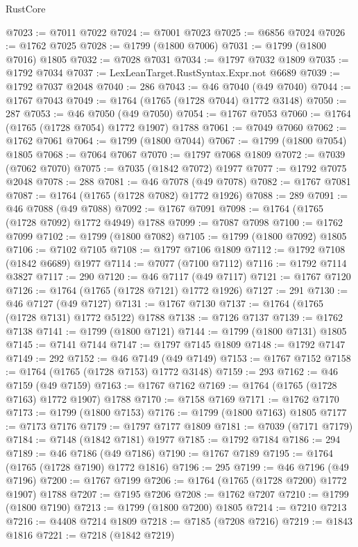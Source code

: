 \begin{lexlean}{RustCore}
\begin{coremodule}
@7023 := @7011 @7022
@7024 := @7001 @7023
@7025 := @6856 @7024
@7026 := @1762 @7025
@7028 := @1799 (@1800 @7006)
@7031 := @1799 (@1800 @7016) @1805
@7032 := @7028 @7031
@7034 := @1797 @7032 @1809
@7035 := @1792 @7034
@7037 := LexLeanTarget.RustSyntax.Expr.not @6689
@7039 := @1792 @7037 @2048
@7040 := 286
@7043 := @46 @7040 (@49 @7040)
@7044 := @1767 @7043
@7049 := @1764 (@1765 (@1728 @7044) @1772 @3148)
@7050 := 287
@7053 := @46 @7050 (@49 @7050)
@7054 := @1767 @7053
@7060 := @1764 (@1765 (@1728 @7054) @1772 @1907) @1788
@7061 := @7049 @7060
@7062 := @1762 @7061
@7064 := @1799 (@1800 @7044)
@7067 := @1799 (@1800 @7054) @1805
@7068 := @7064 @7067
@7070 := @1797 @7068 @1809
@7072 := @7039 (@7062 @7070)
@7075 := @7035 (@1842 @7072) @1977
@7077 := @1792 @7075 @2048
@7078 := 288
@7081 := @46 @7078 (@49 @7078)
@7082 := @1767 @7081
@7087 := @1764 (@1765 (@1728 @7082) @1772 @1926)
@7088 := 289
@7091 := @46 @7088 (@49 @7088)
@7092 := @1767 @7091
@7098 := @1764 (@1765 (@1728 @7092) @1772 @4949) @1788
@7099 := @7087 @7098
@7100 := @1762 @7099
@7102 := @1799 (@1800 @7082)
@7105 := @1799 (@1800 @7092) @1805
@7106 := @7102 @7105
@7108 := @1797 @7106 @1809
@7112 := @1792 @7108 (@1842 @6689) @1977
@7114 := @7077 (@7100 @7112)
@7116 := @1792 @7114 @3827
@7117 := 290
@7120 := @46 @7117 (@49 @7117)
@7121 := @1767 @7120
@7126 := @1764 (@1765 (@1728 @7121) @1772 @1926)
@7127 := 291
@7130 := @46 @7127 (@49 @7127)
@7131 := @1767 @7130
@7137 := @1764 (@1765 (@1728 @7131) @1772 @5122) @1788
@7138 := @7126 @7137
@7139 := @1762 @7138
@7141 := @1799 (@1800 @7121)
@7144 := @1799 (@1800 @7131) @1805
@7145 := @7141 @7144
@7147 := @1797 @7145 @1809
@7148 := @1792 @7147
@7149 := 292
@7152 := @46 @7149 (@49 @7149)
@7153 := @1767 @7152
@7158 := @1764 (@1765 (@1728 @7153) @1772 @3148)
@7159 := 293
@7162 := @46 @7159 (@49 @7159)
@7163 := @1767 @7162
@7169 := @1764 (@1765 (@1728 @7163) @1772 @1907) @1788
@7170 := @7158 @7169
@7171 := @1762 @7170
@7173 := @1799 (@1800 @7153)
@7176 := @1799 (@1800 @7163) @1805
@7177 := @7173 @7176
@7179 := @1797 @7177 @1809
@7181 := @7039 (@7171 @7179)
@7184 := @7148 (@1842 @7181) @1977
@7185 := @1792 @7184
@7186 := 294
@7189 := @46 @7186 (@49 @7186)
@7190 := @1767 @7189
@7195 := @1764 (@1765 (@1728 @7190) @1772 @1816)
@7196 := 295
@7199 := @46 @7196 (@49 @7196)
@7200 := @1767 @7199
@7206 := @1764 (@1765 (@1728 @7200) @1772 @1907) @1788
@7207 := @7195 @7206
@7208 := @1762 @7207
@7210 := @1799 (@1800 @7190)
@7213 := @1799 (@1800 @7200) @1805
@7214 := @7210 @7213
@7216 := @4408 @7214 @1809
@7218 := @7185 (@7208 @7216)
@7219 := @1843 @1816
@7221 := @7218 (@1842 @7219)

\end{coremodule}
\end{lexlean}
